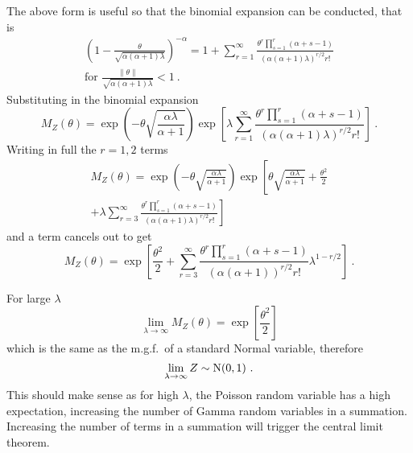 The above form is useful so that the binomial expansion can be conducted, that is
\begin{multline}
	\left(
		1-\frac{\theta}{\sqrt{\alpha(\alpha+1)\lambda}}
	\right)^{-\alpha}
	=
	1+
	\sum_{r=1}^\infty \frac{\theta^r\prod_{s=1}^r(\alpha+s-1)}{(\alpha(\alpha+1)\lambda)^{r/2}r!}
	\\
	\text{for }\frac{\|\theta\|}{\sqrt{\alpha(\alpha+1)\lambda}}<1 \ .
\end{multline}
Substituting in the binomial expansion
\begin{equation*}
	M_Z(\theta)=
	\exp\left(
	    -\theta\sqrt{\frac{\alpha\lambda}{\alpha+1}}
    \right)
	\exp\left[
		\lambda
		\sum_{r=1}^\infty \frac{\theta^r\prod_{s=1}^r(\alpha+s-1)}{(\alpha(\alpha+1)\lambda)^{r/2}r!}
	\right]
	\ .
\end{equation*}
Writing in full the $r=1,2$ terms
\begin{multline*}
	M_Z(\theta)=
	\exp\left(
	    -\theta\sqrt{\frac{\alpha\lambda}{\alpha+1}}
    \right)
	\exp\left[
		\theta\sqrt{\frac{\alpha\lambda}{\alpha+1}}
		+\frac{\theta^2}{2}
	\right.
	\\
	\left.
		+\lambda\sum_{r=3}^\infty \frac{\theta^r\prod_{s=1}^r(\alpha+s-1)}{(\alpha(\alpha+1)\lambda)^{r/2}r!}
	\right]
\end{multline*}
and a term cancels out to get
\begin{equation}
	M_Z(\theta)=
	\exp\left[
		\frac{\theta^2}{2}
		+\sum_{r=3}^\infty
		\frac
			{\theta^r\prod_{s=1}^r(\alpha+s-1)}
			{(\alpha(\alpha+1))^{r/2}r!}
		\lambda^{1-r/2}
	\right]
	\ .
\end{equation}

For large $\lambda$
\begin{equation}
	\lim_{\lambda\rightarrow\infty}M_Z(\theta)=\exp\left[\frac{\theta^2}{2}\right]
\end{equation}
which is the same as the m.g.f.~of a standard Normal variable, therefore
\begin{equation}
	\lim_{\lambda\rightarrow\infty}Z\sim\operatorname{N}(0,1) \ .
\end{equation}
This should make sense as for high $\lambda$, the Poisson random variable has a high expectation, increasing the number of Gamma random variables in a summation. Increasing the number of terms in a summation will trigger the central limit theorem.


